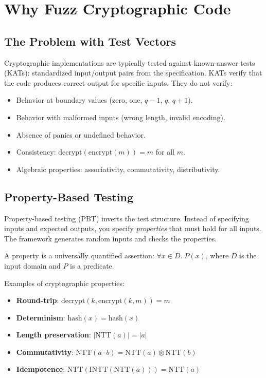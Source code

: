 \section{Why Fuzz Cryptographic Code}


\subsection{The Problem with Test Vectors}

Cryptographic implementations are typically tested against known-answer tests (KATs):
standardized input/output pairs from the specification. KATs verify that the code
produces correct output for specific inputs. They do not verify:

\begin{itemize}[nosep]
  \item Behavior at boundary values (zero, one, $q - 1$, $q$, $q + 1$).
  \item Behavior with malformed inputs (wrong length, invalid encoding).
  \item Absence of panics or undefined behavior.
  \item Consistency: $\text{decrypt}(\text{encrypt}(m)) = m$ for all $m$.
  \item Algebraic properties: associativity, commutativity, distributivity.
\end{itemize}

\subsection{Property-Based Testing}

Property-based testing (PBT) inverts the test structure. Instead of specifying inputs
and expected outputs, you specify \emph{properties} that must hold for all inputs. The
framework generates random inputs and checks the properties.

\begin{definition}[Property]
A property is a universally quantified assertion: $\forall x \in D.\; P(x)$, where $D$
is the input domain and $P$ is a predicate.
\end{definition}

Examples of cryptographic properties:
\begin{itemize}[nosep]
  \item \textbf{Round-trip}: $\text{decrypt}(k, \text{encrypt}(k, m)) = m$
  \item \textbf{Determinism}: $\text{hash}(x) = \text{hash}(x)$
  \item \textbf{Length preservation}: $|\text{NTT}(a)| = |a|$
  \item \textbf{Commutativity}: $\text{NTT}(a \cdot b) = \text{NTT}(a) \otimes \text{NTT}(b)$
  \item \textbf{Idempotence}: $\text{NTT}(\text{INTT}(\text{NTT}(a))) = \text{NTT}(a)$
\end{itemize}

